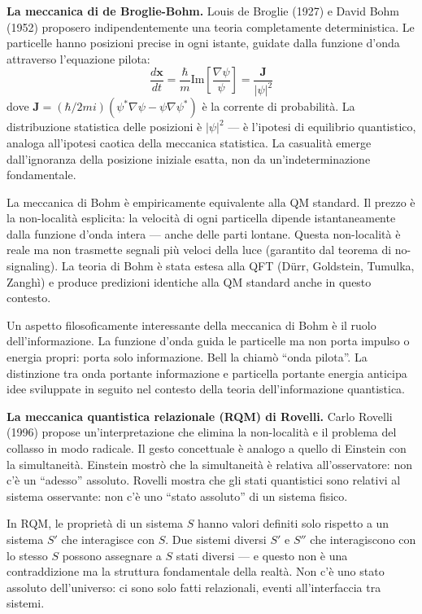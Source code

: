 \documentclass[11.5pt,a4paper,openany]{book}
\theoremstyle{remark}
\begin{document}
\textbf{La meccanica di de Broglie-Bohm.} Louis de Broglie (1927) e David Bohm (1952) proposero indipendentemente una teoria completamente deterministica. Le particelle hanno posizioni precise in ogni istante, guidate dalla funzione d'onda attraverso l'equazione pilota:
\[
\frac{d\mathbf{x}}{dt} = \frac{\hbar}{m} \text{Im}\!\left[\frac{\nabla\psi}{\psi}\right] = \frac{\mathbf{J}}{|\psi|^2}
\]
dove $\mathbf{J} = (\hbar/2mi)(\psi^*\nabla\psi - \psi\nabla\psi^*)$ è la corrente di probabilità. La distribuzione statistica delle posizioni è $|\psi|^2$ --- è l'ipotesi di equilibrio quantistico, analoga all'ipotesi caotica della meccanica statistica. La casualità emerge dall'ignoranza della posizione iniziale esatta, non da un'indeterminazione fondamentale.

La meccanica di Bohm è empiricamente equivalente alla QM standard. Il prezzo è la non-località esplicita: la velocità di ogni particella dipende istantaneamente dalla funzione d'onda intera --- anche delle parti lontane. Questa non-località è reale ma non trasmette segnali più veloci della luce (garantito dal teorema di no-signaling). La teoria di Bohm è stata estesa alla QFT (Dürr, Goldstein, Tumulka, Zanghì) e produce predizioni identiche alla QM standard anche in questo contesto.

Un aspetto filosoficamente interessante della meccanica di Bohm è il ruolo dell'informazione. La funzione d'onda guida le particelle ma non porta impulso o energia propri: porta solo informazione. Bell la chiamò ``onda pilota''. La distinzione tra onda portante informazione e particella portante energia anticipa idee sviluppate in seguito nel contesto della teoria dell'informazione quantistica.

\textbf{La meccanica quantistica relazionale (RQM) di Rovelli.} Carlo Rovelli (1996) propose un'interpretazione che elimina la non-località e il problema del collasso in modo radicale. Il gesto concettuale è analogo a quello di Einstein con la simultaneità. Einstein mostrò che la simultaneità è relativa all'osservatore: non c'è un ``adesso'' assoluto. Rovelli mostra che gli stati quantistici sono relativi al sistema osservante: non c'è uno ``stato assoluto'' di un sistema fisico.

In RQM, le proprietà di un sistema $S$ hanno valori definiti solo rispetto a un sistema $S'$ che interagisce con $S$. Due sistemi diversi $S'$ e $S''$ che interagiscono con lo stesso $S$ possono assegnare a $S$ stati diversi --- e questo non è una contraddizione ma la struttura fondamentale della realtà. Non c'è uno stato assoluto dell'universo: ci sono solo fatti relazionali, eventi all'interfaccia tra sistemi.
\end{document}
